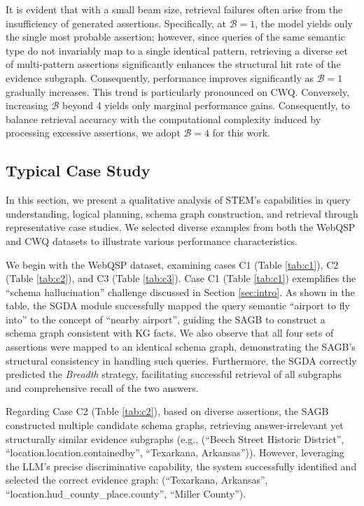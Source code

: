 \documentclass[11pt]{article}
\begin{document}
It is evident that with a small beam size, retrieval failures often arise from the insufficiency of generated assertions. Specifically, at \( \mathcal{B} =1 \), the model yields only the single most probable assertion; however, since queries of the same semantic type do not invariably map to a single identical pattern, retrieving a diverse set of multi-pattern assertions significantly enhances the structural hit rate of the evidence subgraph. Consequently, performance improves significantly as \( \mathcal{B} =1 \) gradually increases. This trend is particularly pronounced on CWQ. Conversely, increasing \( \mathcal{B} \) beyond 4 yields only marginal performance gains. Consequently, to balance retrieval accuracy with the computational complexity induced by processing excessive assertions, we adopt \( \mathcal{B} =4\) for this work.

\subsection{Typical Case Study}

In this section, we present a qualitative analysis of STEM's capabilities in query understanding, logical planning, schema graph construction, and retrieval through representative case studies. We selected diverse examples from both the WebQSP and CWQ datasets to illustrate various performance characteristics.

We begin with the WebQSP dataset, examining cases C1 (Table \ref{tab:c1}), C2 (Table \ref{tab:c2}), and C3 (Table \ref{tab:c3}). Case C1 (Table \ref{tab:c1}) exemplifies the ``schema hallucination'' challenge discussed in Section \ref{sec:intro}. As shown in the table, the SGDA module successfully mapped the query semantic ``airport to fly into'' to the concept of ``nearby airport'', guiding the SAGB to construct a schema graph consistent with KG facts. We also observe that all four sets of assertions were mapped to an identical schema graph, demonstrating the SAGB's structural consistency in handling such queries. Furthermore, the SGDA correctly predicted the \textit{Breadth} strategy, facilitating successful retrieval of all subgraphs and comprehensive recall of the two answers.

Regarding Case C2 (Table \ref{tab:c2}), based on diverse assertions, the SAGB constructed multiple candidate schema graphs, retrieving answer-irrelevant yet structurally similar evidence subgraphs (e.g., (``Beech Street Historic District'', ``location.location.containedby'', ``Texarkana, Arkansas'')). However, leveraging the LLM's precise discriminative capability, the system successfully identified and selected the correct evidence graph: (``Texarkana, Arkansas'', ``location.hud\_county\_place.county'', ``Miller County'').
\end{document}
